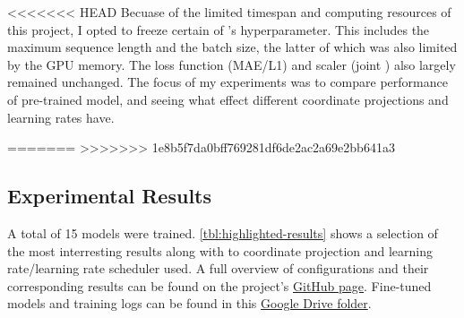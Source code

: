 <<<<<<< HEAD
Becuase of the limited timespan and computing resources of this project, I opted to freeze certain of \citeauthor{scherrerHeLjuVarDial20202020}'s hyperparameter. This includes the maximum sequence length and the batch size, the latter of which was also limited by the GPU memory. The loss function (MAE/L1) and scaler (joint \citep[5]{scherrerHeLjuVarDial20202020}) also largely remained unchanged. The focus of my experiments was to compare performance of pre-trained model, and seeing what effect different coordinate projections and learning rates have.

=======
>>>>>>> 1e8b5f7da0bff769281df6de2ac2a69e2bb641a3
\subsection{Experimental Results}
\label{sec:experimentalResults}

\begin{comment}
Results should be clearly displayed and should provide a suitable representation of your results for the points you wish to make.
Graphs should be labeled in a legible font. If more than one result is displayed in the same graph, then these should be clearly marked.
Please choose carefully rather than presenting every result.
Too much information is hard to read and often hides the key information you wish to present.
Make use of statistical methods when presenting results, where possible to strengthen the results.
Further, the format of the presentation of results should be chosen based on what issues in the results you wish to highlight.
You may wish to present a subset in the experimental section and provide additional results in an appendix.
If there are specific points related to one experiment that you want to discuss in more detail, it could be reasonable to do
that already in this section; however, save the main overall discussion for Section~\ref{sec:Discussion}.
\end{comment}

A total of 15 models were trained. \autoref{tbl:highlighted-results} shows a selection of the most interresting results along with to coordinate projection and learning rate/learning rate scheduler used. A full overview of configurations and their corresponding results can be found on the project's \href{https://github.com/oskarhlm/TDT13}{GitHub page}. Fine-tuned models and training logs can be found in this \href{https://drive.google.com/drive/folders/1-6nAdhvf5DBHtWzpZa6iH7z0dFETi80h?usp=sharing}{Google Drive folder}.

